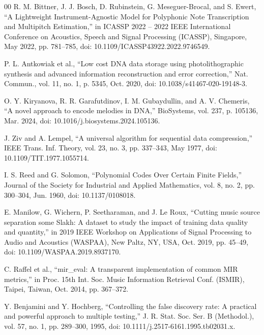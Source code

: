 \documentclass[conference]{IEEEtran}
\begin{document}
\begin{thebibliography}{00}
 R. M. Bittner, J. J. Bosch, D. Rubinstein, G. Meseguer-Brocal, and S. Ewert, ``A Lightweight Instrument-Agnostic Model for Polyphonic Note Transcription and Multipitch Estimation,'' in ICASSP 2022 -- 2022 IEEE International Conference on Acoustics, Speech and Signal Processing (ICASSP), Singapore, May 2022, pp. 781--785, doi: 10.1109/ICASSP43922.2022.9746549.

 P. L. Antkowiak et al., ``Low cost DNA data storage using photolithographic synthesis and advanced information reconstruction and error correction,'' Nat. Commun., vol. 11, no. 1, p. 5345, Oct. 2020, doi: 10.1038/s41467-020-19148-3.

 O. Y. Kiryanova, R. R. Garafutdinov, I. M. Gubaydullin, and A. V. Chemeris, ``A novel approach to encode melodies in DNA,'' BioSystems, vol. 237, p. 105136, Mar. 2024, doi: 10.1016/j.biosystems.2024.105136.

 J. Ziv and A. Lempel, ``A universal algorithm for sequential data compression,'' IEEE Trans. Inf. Theory, vol. 23, no. 3, pp. 337--343, May 1977, doi: 10.1109/TIT.1977.1055714.

 I. S. Reed and G. Solomon, ``Polynomial Codes Over Certain Finite Fields,'' Journal of the Society for Industrial and Applied Mathematics, vol. 8, no. 2, pp. 300--304, Jun. 1960, doi: 10.1137/0108018.

 E. Manilow, G. Wichern, P. Seetharaman, and J. Le Roux, ``Cutting music source separation some Slakh: A dataset to study the impact of training data quality and quantity,'' in 2019 IEEE Workshop on Applications of Signal Processing to Audio and Acoustics (WASPAA), New Paltz, NY, USA, Oct. 2019, pp. 45--49, doi: 10.1109/WASPAA.2019.8937170.

 C. Raffel et al., ``mir\_eval: A transparent implementation of common MIR metrics,'' in Proc. 15th Int. Soc. Music Information Retrieval Conf. (ISMIR), Taipei, Taiwan, Oct. 2014, pp. 367--372.

 Y. Benjamini and Y. Hochberg, ``Controlling the false discovery rate: A practical and powerful approach to multiple testing,'' J. R. Stat. Soc. Ser. B (Methodol.), vol. 57, no. 1, pp. 289--300, 1995, doi: 10.1111/j.2517-6161.1995.tb02031.x.

\end{thebibliography}
\end{document}
